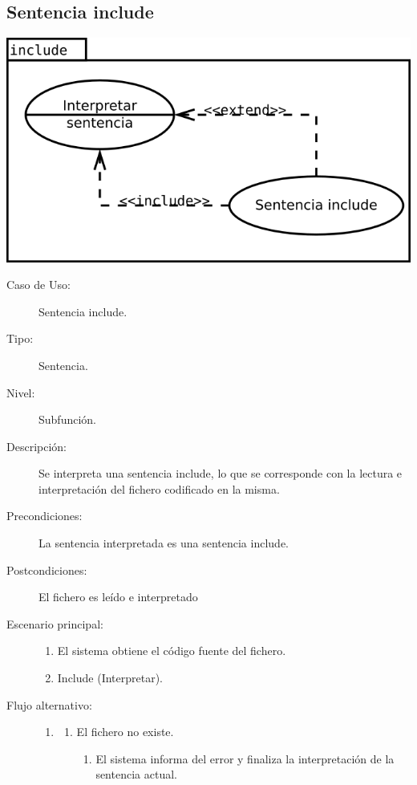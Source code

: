 \subsection {Sentencia include}
\begin{center}
\includegraphics[scale=0.4]{include.png} \\
\end{center}
\begin{framed}
\FloatBarrier
\begin{description}
   \item[Caso de Uso:]  Sentencia include.
   \item [Tipo:] Sentencia.
   \item[Nivel:]  Subfunción.
   \item[Descripción:] 
   Se interpreta una sentencia include, lo que 
   se corresponde con la lectura e interpretación del fichero codificado 
   en la misma. 
   \item[Precondiciones:] 
   La sentencia interpretada es una sentencia include.
   \item[Postcondiciones:] El fichero es leído e interpretado
   \item[Escenario principal:] \hfill
   \begin{enumerate}
   \item El sistema obtiene el código fuente del fichero.
   \item Include (Interpretar).
   \end{enumerate}
   \item[Flujo alternativo:] \hfill 
   \begin{enumerate} \itemsep1pt \parskip0pt 
   \setcounter{enumi}{0}
   \renewcommand{\labelenumi}{}
   \renewcommand{\labelenumiii}{\arabic{enumiii}.}
   \renewcommand{\labelenumii}{\arabic{enumi}\alph{enumii}.}
      \item 
      \begin {enumerate}
         \setcounter{enumii}{0}
         \item El fichero no existe.
         \begin{enumerate}
         \item El sistema informa del error y finaliza la  interpretación 
         de la sentencia actual.
         \end{enumerate}
      \end{enumerate}
   \end{enumerate}
\end{description}
 \FloatBarrier
\end{framed}

